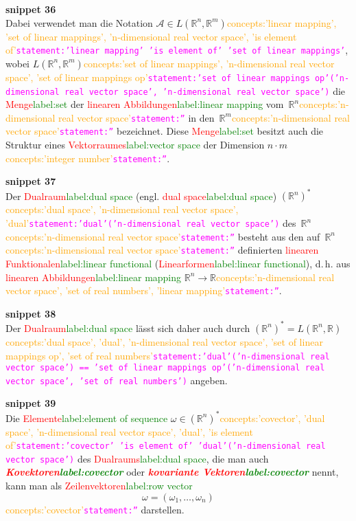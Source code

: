 \documentclass[a4paper,twoside,english,ngerman,deutsch,german,sectrefs,envcountsame,envcountchap]{svmono}
\newcommand{\setref}[2]{\textcolor{red}{#1}\textcolor{green}{#2}}
\newcommand{\snippet}[1]{\textbf{snippet #1}\\}
\newcommand{\eqnote}[2]{\textcolor{orange}{#1}\textcolor{magenta}{\texttt{#2}}}
\begin{document}
\snippet{36}
Dabei verwendet man die Notation $\mathcal{A}\in L({\mathbb{R}}^{n},{\mathbb{R}}^{m})$\eqnote{concepts:'linear mapping', 'set of linear mappings', 'n-dimensional real vector space', 'is element of'}{statement:'linear mapping' 'is element of' 'set of linear mappings'}, wobei $L({\mathbb{R}}^{n},{\mathbb{R}}^{m})$\eqnote{concepts:'set of linear mappings', 'n-dimensional real vector space', 'set of linear mappings op'}{statement:'set of linear mappings op'('n-dimensional real vector space', 'n-dimensional real vector space')} die \setref{Menge}{label:set} der \setref{linearen Abbildungen}{label:linear mapping} vom~${\mathbb{R}}^{n}$\eqnote{concepts:'n-dimensional real vector space'}{statement:''} in den~${\mathbb{R}}^{m}$\eqnote{concepts:'n-dimensional real vector space'}{statement:''} bezeichnet. Diese \setref{Menge}{label:set} besitzt auch die Struktur eines \setref{Vektorraumes}{label:vector space} der Dimension $n\cdot m$\eqnote{concepts:'integer number'}{statement:''}.

\snippet{37}
Der \setref{Dualraum}{label:dual space} (engl. \setref{dual space}{label:dual space}) $({\mathbb{R}}^{n})^{*}$\eqnote{concepts:'dual space', 'n-dimensional real vector space', 'dual'}{statement:'dual'('n-dimensional real vector space')} des~${\mathbb{R}}^{n}$\eqnote{concepts:'n-dimensional real vector space'}{statement:''} besteht aus den auf~${\mathbb{R}}^{n}$\eqnote{concepts:'n-dimensional real vector space'}{statement:''} definierten \setref{linearen Funktionalen}{label:linear functional} (\setref{Linearformen}{label:linear functional}), d.\,h. aus \setref{linearen Abbildungen}{label:linear mapping} ${\mathbb{R}}^{n}\to{\mathbb{R}}$\eqnote{concepts:'n-dimensional real vector space', 'set of real numbers', 'linear mapping'}{statement:''}.

\snippet{38}
Der \setref{Dualraum}{label:dual space} lässt sich daher auch durch $({\mathbb{R}}^{n})^{*}=L({\mathbb{R}}^{n},{\mathbb{R}})$\eqnote{concepts:'dual space', 'dual', 'n-dimensional real vector space', 'set of linear mappings op', 'set of real numbers'}{statement:'dual'('n-dimensional real vector space') == 'set of linear mappings op'('n-dimensional real vector space', 'set of real numbers')} angeben.

\snippet{39}
Die \setref{Elemente}{label:element of sequence} $\omega\in({\mathbb{R}}^{n})^{*}$\eqnote{concepts:'covector', 'dual space', 'n-dimensional real vector space', 'dual', 'is element of'}{statement:'covector' 'is element of' 'dual'('n-dimensional real vector space')} des \setref{Dualraums}{label:dual space}, die man auch \textbf{\em \setref{Kovektoren}{label:covector}} oder \textbf{\em \setref{kovariante Vektoren}{label:covector}} nennt, kann man als \setref{Zeilenvektoren}{label:row vector}
\[
\omega=\left(\omega_{1},\ldots,\omega_{n}\right)
\]\eqnote{concepts:'covector'}{statement:''}
darstellen.
\end{document}
